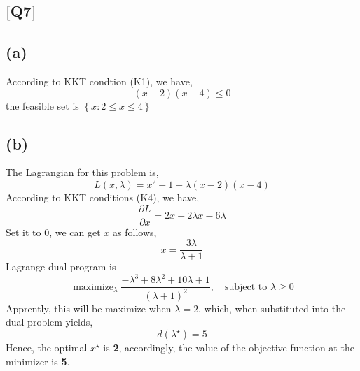 \documentclass[12pt, a4 paper]{article}
\begin{document}
\begin{framed}
    \section{[Q7]}
    \subsection{(a)}
    According to KKT condtion (K1), we have,
    \begin{equation}
        (x-2)(x-4) \leq 0
    \end{equation}
    \indent the feasible set is $ \left\{x: 2 \leq x \leq 4 \right\} $

    \subsection{(b)}
    The Lagrangian for this problem is,
    $$
        L(x, \lambda) = x^{2}+1 + \lambda (x-2)(x-4)
    $$
    \indent According to KKT conditions (K4), we have,
    $$
    \frac{\partial{L}}{\partial x} = 2x + 2\lambda x - 6\lambda
    $$
    \indent Set it to 0, we can get $x$ as follows,
    $$
    x = \frac{3\lambda}{\lambda + 1}
    $$
    \indent Lagrange dual program is
    $$
    \mathop{\text{maximize}}_{\lambda} \frac{-\lambda^{3} +
    8\lambda^{2} + 10\lambda + 1}{(\lambda+1)^{2}}, \quad
    \text{subject to } \lambda \geq 0
    $$
    \indent Apprently, this will be maximize when $\lambda=2$,
    which, when substituted into the dual problem yields,
    $$
    d(\lambda^{\star}) = 5
    $$
    \indent Hence, the optimal $x^{\star}$ is \textbf{2}, accordingly,
    the value of the objective function at the minimizer is \textbf{5}.


\end{framed}
\end{document}
